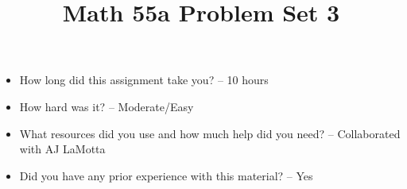 \documentclass[11pt,letterpaper]{article}
\title{\textbf{Math 55a Problem Set 3}}
\begin{document}
\maketitle
\setcounter{page}{0}
\thispagestyle{empty}

\begin{itemize}
  \item How long did this assignment take you? -- 10 hours
  \item How hard was it? -- Moderate/Easy
  \item What resources did you use and how much help did you need? -- Collaborated with AJ LaMotta
  \item Did you have any prior experience with this material? -- Yes
\end{itemize}

\pagebreak


\pagebreak


\pagebreak


\pagebreak


\pagebreak


\pagebreak


\pagebreak


\pagebreak


\pagebreak


\pagebreak

\end{document}
